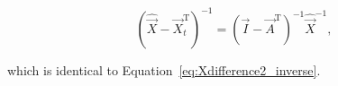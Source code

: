 \begin{equation} \label{eq:Xdifference2_inverse_Proof-4}
	\left(\hat{\vec{X}} - \vec{X}_t^\mathrm{T}\right)^{-1} = (\vec{I} - \vec{A}^{\mathrm{T}})^{-1} \hat{\vec{X}}^{-1},
\end{equation}

\noindent which is identical to Equation~\ref{eq:Xdifference2_inverse}.



%
%
%
%
%
%
